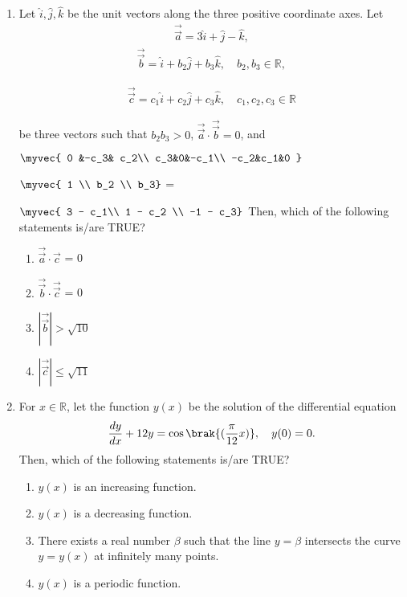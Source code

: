\documentclass{article}
\begin{document}
\begin{enumerate}
    \item Let $\hat{i}, \hat{j}, \hat{k}$ be the unit vectors along the three positive coordinate axes. Let  
	    \begin{align}
		    \vec{\overrightarrow{a}} = 3\hat{i} + \hat{j} - \hat{k}, 
	    \end{align}
\begin{align}	    
        \vec{\overrightarrow{b}}  = \hat{i} + b_2 \hat{j} + b_3 \hat{k}, \quad b_2, b_3 \in \mathbb{R},
\end{align}

	    \begin{align}
    \vec{\overrightarrow{c}} = c_1 \hat{i} + c_2 \hat{j} + c_3 \hat{k}, \quad c_1, c_2, c_3 \in \mathbb{R}
	    \end{align}
	    
    be three vectors such that $b_2 b_3 > 0$, $\vec{\overrightarrow{a}} \cdot \vec{\overrightarrow{b}} = 0$, and  

$\myvec{
0 &-c_3& c_2\\
c_3&0&-c_1\\
-c_2&c_1&0 
}$
    
$\myvec{
1 \\
b_2 \\
b_3}
$
    =

$\myvec{
3 - c_1\\
1 - c_2 \\
-1 - c_3}
$
Then, which of the following statements is/are TRUE?
    \begin{enumerate}
	    \item $\vec{\overrightarrow{a}} \cdot \vec{c}$ = 0
	    \item $\vec{\overrightarrow{b}} \cdot \vec{\overrightarrow{c}}$ = 0
	    \item $|\vec{\overrightarrow{b}}| > \sqrt{10}$
	    \item $|\vec{\overrightarrow{c}}| \leq \sqrt{11}$
    \end{enumerate}
    


    \item For $x \in \mathbb{R}$, let the function $y(x)$ be the solution of the differential equation  
	    \begin{align}
    \frac{dy}{dx} + 12y = \cos \brak{(\frac{\pi}{12} x )}, \quad y(0) = 0.
	    \end{align}
    Then, which of the following statements is/are TRUE?

    \begin{enumerate}
        \item $y(x)$ is an increasing function.
        \item $y(x)$ is a decreasing function.
        \item There exists a real number $\beta$ such that the line $y = \beta$ intersects the curve $y = y(x)$ at infinitely many points.
        \item $y(x)$ is a periodic function.
    \end{enumerate}




\end{enumerate}
\end{document}
